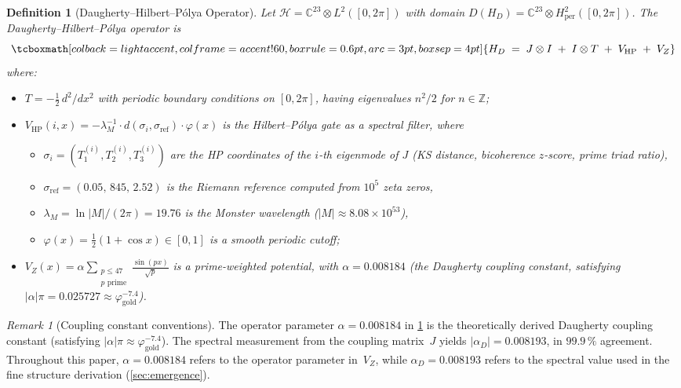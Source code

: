 \documentclass[11pt,a4paper]{article}
\theoremstyle{plain}
\newtheorem{definition}[theorem]{Definition}
\theoremstyle{remark}
\newtheorem{remark}[theorem]{Remark}
\newcommand{\Z}{\mathbb{Z}}
\newcommand{\C}{\mathbb{C}}
\newcommand{\HH}{\mathcal{H}}
\begin{document}
\begin{definition}[Daugherty--Hilbert--P\'olya Operator]\label{def:HD}
Let $\HH = \C^{23}\otimes L^2([0,2\pi])$ with domain
$D(H_D) = \C^{23}\otimes H^2_{\mathrm{per}}([0,2\pi])$.
The \emph{Daugherty--Hilbert--P\'olya operator} is
\begin{equation}\label{eq:HD}
  \tcboxmath[colback=lightaccent, colframe=accent!60,
    boxrule=0.6pt, arc=3pt, boxsep=4pt]{
    H_D \;=\; J\otimes I \;+\; I\otimes T \;+\; V_{\mathrm{HP}} \;+\; V_Z
  }
\end{equation}
where:
\begin{itemize}[nosep]
  \item $T = -\tfrac{1}{2}\,d^2/dx^2$ with periodic boundary conditions
        on $[0,2\pi]$, having eigenvalues $n^2/2$ for $n\in\Z$;
  \item $V_{\mathrm{HP}}(i,x)
        = -\lambda_M^{-1}\cdot d(\sigma_i,\sigma_{\mathrm{ref}})\cdot\varphi(x)$
        is the Hilbert--P\'olya gate as a spectral filter, where
        \begin{itemize}[nosep]
          \item $\sigma_i=(T_1^{(i)},T_2^{(i)},T_3^{(i)})$ are the HP
                coordinates of the $i$-th eigenmode of $J$ (KS distance,
                bicoherence $z$-score, prime triad ratio),
          \item $\sigma_{\mathrm{ref}}=(0.05,\,845,\,2.52)$ is the Riemann
                reference computed from $10^5$ zeta zeros,
          \item $\lambda_M = \ln|M|/(2\pi) = 19.76$ is the Monster wavelength
                ($|M|\approx 8.08\times 10^{53}$),
          \item $\varphi(x) = \tfrac{1}{2}(1+\cos x)\in[0,1]$ is a smooth
                periodic cutoff;
        \end{itemize}
  \item $V_Z(x) = \alpha\displaystyle\sum_{\substack{p\leq 47\\p\text{ prime}}}
        \frac{\sin(px)}{\sqrt{p}}$ is a prime-weighted potential, with
        $\alpha=0.008184$ (the Daugherty coupling constant, satisfying
        $|\alpha|\pi=0.025727\approx\varphi_{\mathrm{gold}}^{-7.4}$).
\end{itemize}
\end{definition}

\begin{remark}[Coupling constant conventions]\label{rem:alpha-values}
The operator parameter $\alpha=0.008184$ in \cref{def:HD} is the
theoretically derived Daugherty coupling constant (satisfying
$|\alpha|\pi\approx\varphi_{\mathrm{gold}}^{-7.4}$).  The spectral
measurement from the coupling matrix~$J$ yields
$|\alpha_D|=0.008193$, in $99.9\,\%$ agreement.  Throughout this paper,
$\alpha=0.008184$ refers to the operator parameter in~$V_Z$, while
$\alpha_D=0.008193$ refers to the spectral value used in the fine
structure derivation (\cref{sec:emergence}).
\end{remark}
\end{document}
